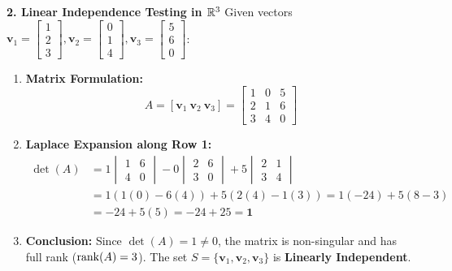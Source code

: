 \textbf{2. Linear Independence Testing in $\mathbb{R}^3$}
Given vectors $\mathbf{v}_1 = \begin{bmatrix} 1 \\ 2 \\ 3 \end{bmatrix}, \mathbf{v}_2 = \begin{bmatrix} 0 \\ 1 \\ 4 \end{bmatrix}, \mathbf{v}_3 = \begin{bmatrix} 5 \\ 6 \\ 0 \end{bmatrix}$:
\begin{enumerate}
    \item \textbf{Matrix Formulation:}
    \begin{equation*}
    A = [\mathbf{v}_1 \ \mathbf{v}_2 \ \mathbf{v}_3] = \begin{bmatrix} 1 & 0 & 5 \\ 2 & 1 & 6 \\ 3 & 4 & 0 \end{bmatrix}
    \end{equation*}
    \item \textbf{Laplace Expansion along Row 1:}
    \begin{align*}
    \det(A) &= 1 \begin{vmatrix} 1 & 6 \\ 4 & 0 \end{vmatrix} - 0 \begin{vmatrix} 2 & 6 \\ 3 & 0 \end{vmatrix} + 5 \begin{vmatrix} 2 & 1 \\ 3 & 4 \end{vmatrix} \\
    &= 1(1(0) - 6(4)) + 5(2(4) - 1(3)) = 1(-24) + 5(8 - 3) \\
    &= -24 + 5(5) = -24 + 25 = \mathbf{1}
    \end{align*}
    \item \textbf{Conclusion:}
    Since $\det(A) = 1 \neq 0$, the matrix is non-singular and has full rank ($\operatorname{rank}(A) = 3$). The set $S = \{\mathbf{v}_1, \mathbf{v}_2, \mathbf{v}_3\}$ is \textbf{Linearly Independent}.
\end{enumerate}

